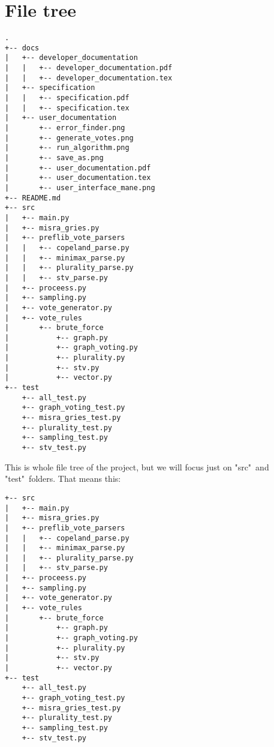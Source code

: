 \documentclass[a4paper,12pt]{report}
\begin{document}
	\pagestyle{toc}
	\tableofcontents
	\cleardoublepage
	\pagestyle{plain}
	\pagebreak
	
	\chapter{File tree}
	
	\begin{Verbatim}[fontsize=\small]
.
+-- docs
|   +-- developer_documentation
|   |   +-- developer_documentation.pdf
|   |   +-- developer_documentation.tex
|   +-- specification
|   |   +-- specification.pdf
|   |   +-- specification.tex
|   +-- user_documentation
|       +-- error_finder.png
|       +-- generate_votes.png
|       +-- run_algorithm.png
|       +-- save_as.png
|       +-- user_documentation.pdf
|       +-- user_documentation.tex
|       +-- user_interface_mane.png
+-- README.md
+-- src
|   +-- main.py
|   +-- misra_gries.py
|   +-- preflib_vote_parsers
|   |   +-- copeland_parse.py
|   |   +-- minimax_parse.py
|   |   +-- plurality_parse.py
|   |   +-- stv_parse.py
|   +-- proceess.py
|   +-- sampling.py
|   +-- vote_generator.py
|   +-- vote_rules
|       +-- brute_force
|           +-- graph.py
|           +-- graph_voting.py
|           +-- plurality.py
|           +-- stv.py
|           +-- vector.py
+-- test
    +-- all_test.py
    +-- graph_voting_test.py
    +-- misra_gries_test.py
    +-- plurality_test.py
    +-- sampling_test.py
    +-- stv_test.py
	\end{Verbatim}
	
	This is whole file tree of the project, but we will focus just on "src"\ and "test"\ folders. That means this:
	
	\newpage
	
		\begin{Verbatim}[fontsize=\small]
+-- src
|   +-- main.py
|   +-- misra_gries.py
|   +-- preflib_vote_parsers
|   |   +-- copeland_parse.py
|   |   +-- minimax_parse.py
|   |   +-- plurality_parse.py
|   |   +-- stv_parse.py
|   +-- proceess.py
|   +-- sampling.py
|   +-- vote_generator.py
|   +-- vote_rules
|       +-- brute_force
|           +-- graph.py
|           +-- graph_voting.py
|           +-- plurality.py
|           +-- stv.py
|           +-- vector.py
+-- test
    +-- all_test.py
    +-- graph_voting_test.py
    +-- misra_gries_test.py
    +-- plurality_test.py
    +-- sampling_test.py
    +-- stv_test.py
	\end{Verbatim}
	
\end{document}

